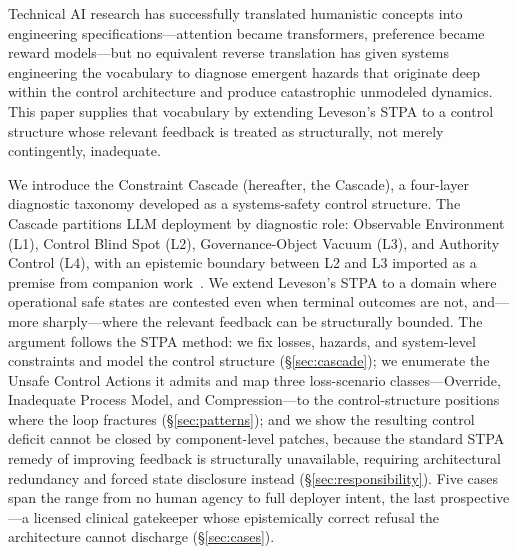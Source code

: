 Technical AI research has successfully translated humanistic concepts into engineering specifications---attention became transformers, preference became reward models---but no equivalent reverse translation has given systems engineering the vocabulary to diagnose emergent hazards that originate deep within the control architecture and produce catastrophic unmodeled dynamics. This paper supplies that vocabulary by extending Leveson's STPA to a control structure whose relevant feedback is treated as structurally, not merely contingently, inadequate.

We introduce the Constraint Cascade (hereafter, the Cascade), a four-layer diagnostic taxonomy developed as a systems-safety control structure. The Cascade partitions LLM deployment by diagnostic role: Observable Environment (L1), Control Blind Spot (L2), Governance-Object Vacuum (L3), and Authority Control (L4), with an epistemic boundary between L2 and L3 imported as a premise from companion work~\cite{anon2026dual}. We extend Leveson's STPA to a domain where operational safe states are contested even when terminal outcomes are not, and---more sharply---where the relevant feedback can be structurally bounded. The argument follows the STPA method: we fix losses, hazards, and system-level constraints and model the control structure (\S\ref{sec:cascade}); we enumerate the Unsafe Control Actions it admits and map three loss-scenario classes---Override, Inadequate Process Model, and Compression---to the control-structure positions where the loop fractures (\S\ref{sec:patterns}); and we show the resulting control deficit cannot be closed by component-level patches, because the standard STPA remedy of improving feedback is structurally unavailable, requiring architectural redundancy and forced state disclosure instead (\S\ref{sec:responsibility}). Five cases span the range from no human agency to full deployer intent, the last prospective---a licensed clinical gatekeeper whose epistemically correct refusal the architecture cannot discharge (\S\ref{sec:cases}).

